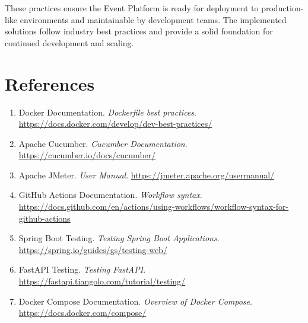 \documentclass[12pt,a4paper]{article}
\begin{document}
These practices ensure the Event Platform is ready for deployment to production-like environments and maintainable by development teams. The implemented solutions follow industry best practices and provide a solid foundation for continued development and scaling.

\section{References}

\begin{enumerate}
    \item Docker Documentation. \textit{Dockerfile best practices}. \url{https://docs.docker.com/develop/dev-best-practices/}
    \item Apache Cucumber. \textit{Cucumber Documentation}. \url{https://cucumber.io/docs/cucumber/}
    \item Apache JMeter. \textit{User Manual}. \url{https://jmeter.apache.org/usermanual/}
    \item GitHub Actions Documentation. \textit{Workflow syntax}. \url{https://docs.github.com/en/actions/using-workflows/workflow-syntax-for-github-actions}
    \item Spring Boot Testing. \textit{Testing Spring Boot Applications}. \url{https://spring.io/guides/gs/testing-web/}
    \item FastAPI Testing. \textit{Testing FastAPI}. \url{https://fastapi.tiangolo.com/tutorial/testing/}
    \item Docker Compose Documentation. \textit{Overview of Docker Compose}. \url{https://docs.docker.com/compose/}
\end{enumerate}
\end{document}
